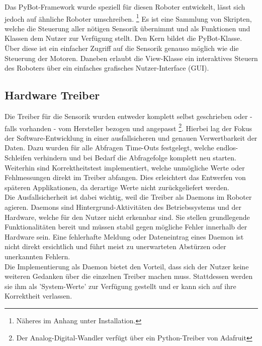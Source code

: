 \documentclass[twoside,11pt, a4paper]{report}
\begin{document}
	Das PyBot-Framework wurde speziell für diesen Roboter entwickelt, lässt sich jedoch auf ähnliche Roboter umschreiben. \footnote{Näheres im Anhang unter Installation.}
	Es ist eine Sammlung von Skripten, welche die Steuerung aller nötigen Sensorik übernimmt und als Funktionen und Klassen dem Nutzer zur Verfügung stellt. Den Kern bildet die PyBot-Klasse. Über diese ist ein einfacher Zugriff auf die Sensorik genauso möglich wie die Steuerung der Motoren. Daneben erlaubt die View-Klasse ein interaktives Steuern des Roboters über ein einfaches grafisches Nutzer-Interface (GUI). 

	\subsection{Hardware Treiber}
	Die Treiber für die Sensorik wurden entweder komplett selbst geschrieben oder - falls vorhanden - vom Hersteller bezogen und angepasst \footnote{Der Analog-Digital-Wandler verfügt über ein Python-Treiber von Adafruit}. Hierbei lag der Fokus der Software-Entwicklung in einer ausfallsicheren und genauen Verwertbarkeit der Daten. Dazu wurden für alle Abfragen Time-Outs festgelegt, welche endlos-Schleifen verhindern und bei Bedarf die Abfragefolge komplett neu starten. Weiterhin sind Korrektheitstest implementiert, welche unmögliche Werte oder Fehlmessungen direkt im Treiber abfangen. Dies erleichtert das Entwerfen von späteren Applikationen, da derartige Werte nicht zurückgeliefert werden. \\
	Die Ausfallsicherheit ist dabei wichtig, weil die Treiber als Daemons im Roboter agieren. Daemons sind Hintergrund-Aktivitäten des Betriebssystems und der Hardware, welche für den Nutzer nicht erkennbar sind. Sie stellen grundlegende Funktionalitäten bereit und müssen stabil gegen mögliche Fehler innerhalb der Hardware sein. Eine fehlerhafte Meldung oder Dateneintrag eines Daemon ist nicht direkt ersichtlich und führt meist zu unerwarteten Abstürzen oder unerkannten Fehlern. \\
	Die Implementierung als Daemon bietet den Vorteil, dass sich der Nutzer keine weiteren Gedanken über die einzelnen Treiber machen muss. Stattdessen werden sie ihm als 'System-Werte' zur Verfügung gestellt und er kann sich auf ihre Korrektheit verlassen. 
	
	\FloatBarrier
\end{document}

